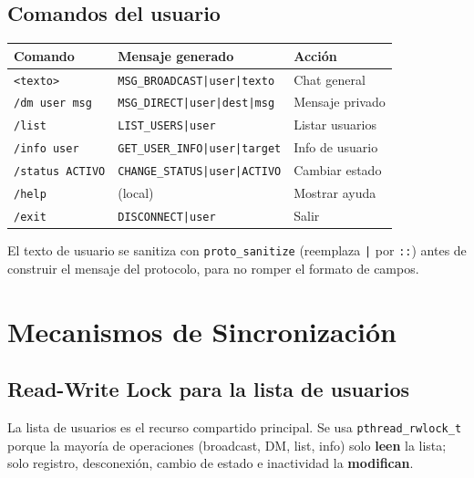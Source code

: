 \documentclass[12pt,a4paper]{article}
\begin{document}
\subsection{Comandos del usuario}

\begin{center}
\begin{tabular}{lll}
\toprule
\textbf{Comando} & \textbf{Mensaje generado} & \textbf{Acción} \\
\midrule
\texttt{<texto>}           & \texttt{MSG\_BROADCAST|user|texto}     & Chat general \\
\texttt{/dm user msg}      & \texttt{MSG\_DIRECT|user|dest|msg}     & Mensaje privado \\
\texttt{/list}             & \texttt{LIST\_USERS|user}              & Listar usuarios \\
\texttt{/info user}        & \texttt{GET\_USER\_INFO|user|target}   & Info de usuario \\
\texttt{/status ACTIVO}    & \texttt{CHANGE\_STATUS|user|ACTIVO}    & Cambiar estado \\
\texttt{/help}             & (local)                                & Mostrar ayuda \\
\texttt{/exit}             & \texttt{DISCONNECT|user}               & Salir \\
\bottomrule
\end{tabular}
\end{center}

El texto de usuario se sanitiza con \texttt{proto\_sanitize} (reemplaza \texttt{|}
por \texttt{::}) antes de construir el mensaje del protocolo, para no romper el
formato de campos.

\section{Mecanismos de Sincronización}
\label{sec:sync}

\subsection{Read-Write Lock para la lista de usuarios}

La lista de usuarios es el recurso compartido principal.  Se usa
\texttt{pthread\_rwlock\_t} porque la mayoría de operaciones (broadcast, DM, list,
info) solo \textbf{leen} la lista; solo registro, desconexión, cambio de estado e
inactividad la \textbf{modifican}.
\end{document}
